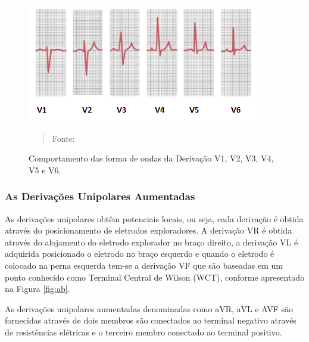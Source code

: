 \documentclass[12pt, a4paper]{article}
\begin{document}
\begin{figure}[H]
\begin{center}
			\caption{Comportamento das forma de ondas da Derivação V1, V2, V3, V4, V5 e V6.}
			\includegraphics[width=.5\textwidth]{Figuras/DEV.PNG}
            \vspace*{\fill} 
            \begin{quote} 
            \centering 
            Fonte: \cite{guyton}
            \end{quote}
            \vspace*{\fill}
			\label{fig:d2}
\end{center}
\end{figure}


\subsubsection{As Derivações Unipolares Aumentadas}


\hspace*{0.8cm}As derivações  unipolares obtêm potenciais locais, ou seja, cada derivação é obtida através do posicionamento de eletrodos exploradores. A derivação VR é obtida através do alojamento do eletrodo explorador no braço direito, a derivação VL é adquirida posicionado o eletrodo no braço esquerdo e quando o eletrodo é colocado na perna esquerda tem-se a derivação VF que são baseadas em um ponto conhecido como Terminal Central de Wilson (WCT), conforme apresentado na Figura \ref{fig:ab}.

As derivações unipolares aumentadas denominadas como aVR, aVL e AVF são fornecidas através de dois membros são conectados ao terminal negativo através de resistências elétricas e o terceiro membro conectado ao terminal positivo.
\end{document}
